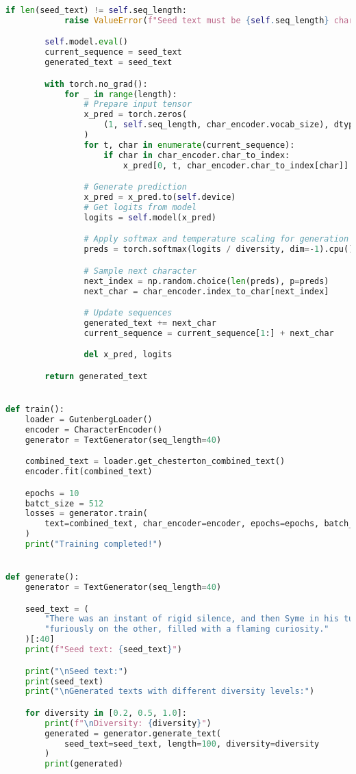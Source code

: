 \documentclass[12pt]{article}
\begin{document}
\begin{lstlisting}[language=Python]
        if len(seed_text) != self.seq_length:
            raise ValueError(f"Seed text must be {self.seq_length} characters long")

        self.model.eval()
        current_sequence = seed_text
        generated_text = seed_text

        with torch.no_grad():
            for _ in range(length):
                # Prepare input tensor
                x_pred = torch.zeros(
                    (1, self.seq_length, char_encoder.vocab_size), dtype=torch.float32
                )
                for t, char in enumerate(current_sequence):
                    if char in char_encoder.char_to_index:
                        x_pred[0, t, char_encoder.char_to_index[char]] = 1

                # Generate prediction
                x_pred = x_pred.to(self.device)
                # Get logits from model
                logits = self.model(x_pred)

                # Apply softmax and temperature scaling for generation
                preds = torch.softmax(logits / diversity, dim=-1).cpu().numpy()[0]

                # Sample next character
                next_index = np.random.choice(len(preds), p=preds)
                next_char = char_encoder.index_to_char[next_index]

                # Update sequences
                generated_text += next_char
                current_sequence = current_sequence[1:] + next_char

                del x_pred, logits

        return generated_text


def train():
    loader = GutenbergLoader()
    encoder = CharacterEncoder()
    generator = TextGenerator(seq_length=40)

    combined_text = loader.get_chesterton_combined_text()
    encoder.fit(combined_text)

    epochs = 10
    batct_size = 512
    losses = generator.train(
        text=combined_text, char_encoder=encoder, epochs=epochs, batch_size=batct_size
    )
    print("Training completed!")


def generate():
    generator = TextGenerator(seq_length=40)

    seed_text = (
        "There was an instant of rigid silence, and then Syme in his turn fell "
        "furiously on the other, filled with a flaming curiosity."
    )[:40]
    print(f"Seed text: {seed_text}")

    print("\nSeed text:")
    print(seed_text)
    print("\nGenerated texts with different diversity levels:")

    for diversity in [0.2, 0.5, 1.0]:
        print(f"\nDiversity: {diversity}")
        generated = generator.generate_text(
            seed_text=seed_text, length=100, diversity=diversity
        )
        print(generated)
\end{lstlisting}
\end{document}
